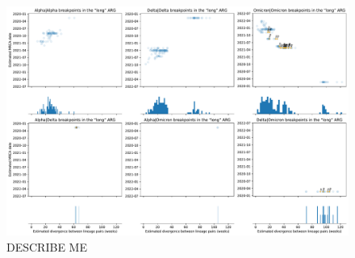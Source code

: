 \documentclass{article}
\begin{document}
\begin{figure} \centering
\includegraphics[width=\textwidth]{figures/supp_recombination_node_mrcas.pdf}
\caption{\label{fig:recomb_mrcas_lineage_breakdown}  DESCRIBE ME}
\end{figure}
\end{document}
